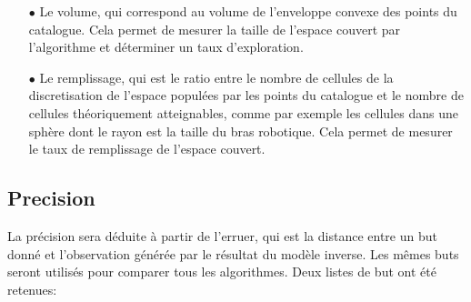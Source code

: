 \documentclass[11pt,french]{report}
\begin{document}
\begin{itemize}
    \item[$\bullet$] Le volume, qui correspond au volume de l'enveloppe convexe des points du catalogue. Cela permet de mesurer la taille de l'espace couvert par l'algorithme et déterminer un taux d'exploration.
    \item[$\bullet$] Le remplissage, qui est le ratio entre le nombre de cellules de la discretisation de l'espace populées par les points du catalogue et le nombre de cellules théoriquement atteignables, comme par exemple les cellules dans une sphère dont le rayon est la taille du bras robotique. Cela permet de mesurer le taux de remplissage de l'espace couvert.
\end{itemize}

\subsection{Precision}

La précision sera déduite à partir de l'erruer, qui est la distance entre un but donné et l'observation générée par le résultat du modèle inverse. Les mêmes buts seront utilisés pour comparer tous les algorithmes. Deux listes de but ont été retenues:
\end{document}
